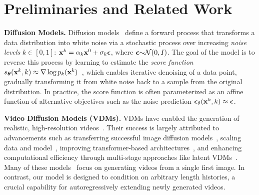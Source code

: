 \section{Preliminaries and Related Work}


 
\textbf{Diffusion Models.}
Diffusion models~\cite{sohl2015deep, ddpm, song2021scorebased} define a forward process that transforms a data distribution into white noise via a stochastic process over increasing \emph{noise levels} $k \in [0, 1]$: ${\mathbf{x}}^k = \alpha_k {\mathbf{x}}^0 + \sigma_k \bm{\epsilon}$, where $\bm{\epsilon} \mkern-5mu \sim \mkern-5mu \mathcal{N}(0, I)$. The goal of the model is to reverse this process by learning to estimate the \emph{score function} $s_{\bm{\theta}}({\mathbf{x}}^k, k) \approx {\nabla \log\,} p_k({\mathbf{x}}^k)$~\cite{vincent2011connection}, which enables iterative denoising of a data point, gradually transforming it from white noise back to a sample from the original distribution. In practice, the score function is often parameterized as an affine function of alternative objectives such as the noise prediction $\bm{\epsilon}_\theta({\mathbf{x}}^k, k)\approx 
 \bm{\epsilon}$. 

\textbf{Video Diffusion Models (VDMs).} VDMs have enabled the generation of realistic, high-resolution videos~\cite{videoworldsimulators2024,yang2024cogvideox,zheng2024open,kong2024hunyuanvideo}. Their success is largely attributed to advancements such as transferring successful image diffusion models~\cite{singer2022make, guo2023animatediff}, scaling data and model~\cite{blattmann2023stable}, improving transformer-based architectures~\cite{peebles2023scalable, gupta2023photorealistic,jin2024pyramidal}, and enhancing computational efficiency through multi-stage approaches like latent VDMs~\cite{he2022latent, blattmann2023align, ma2024latte,yin2024slow}. 
Many of these models~\cite{blattmann2023stable, yang2024cogvideox} focus on generating videos from a single first image. In contrast, our model is designed to condition on arbitrary length histories, a crucial capability for autoregressively extending newly generated videos.

